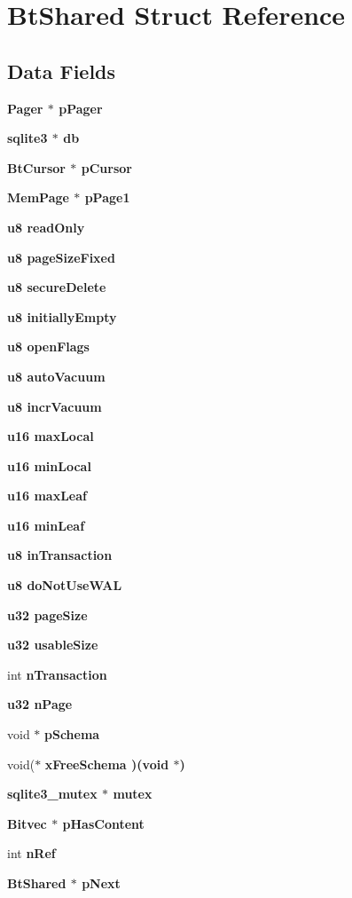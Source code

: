 \section{Bt\-Shared Struct Reference}
\label{structBtShared}
\subsection*{Data Fields}
\begin{CompactItemize}
\item 
\bf{Pager} $\ast$ \bf{p\-Pager}
\item 
\bf{sqlite3} $\ast$ \bf{db}
\item 
\bf{Bt\-Cursor} $\ast$ \bf{p\-Cursor}
\item 
\bf{Mem\-Page} $\ast$ \bf{p\-Page1}
\item 
\bf{u8} \bf{read\-Only}
\item 
\bf{u8} \bf{page\-Size\-Fixed}
\item 
\bf{u8} \bf{secure\-Delete}
\item 
\bf{u8} \bf{initially\-Empty}
\item 
\bf{u8} \bf{open\-Flags}
\item 
\bf{u8} \bf{auto\-Vacuum}
\item 
\bf{u8} \bf{incr\-Vacuum}
\item 
\bf{u16} \bf{max\-Local}
\item 
\bf{u16} \bf{min\-Local}
\item 
\bf{u16} \bf{max\-Leaf}
\item 
\bf{u16} \bf{min\-Leaf}
\item 
\bf{u8} \bf{in\-Transaction}
\item 
\bf{u8} \bf{do\-Not\-Use\-WAL}
\item 
\bf{u32} \bf{page\-Size}
\item 
\bf{u32} \bf{usable\-Size}
\item 
int \bf{n\-Transaction}
\item 
\bf{u32} \bf{n\-Page}
\item 
void $\ast$ \bf{p\-Schema}
\item 
void($\ast$ \bf{x\-Free\-Schema} )(void $\ast$)
\item 
\bf{sqlite3\_\-mutex} $\ast$ \bf{mutex}
\item 
\bf{Bitvec} $\ast$ \bf{p\-Has\-Content}
\item 
int \bf{n\-Ref}
\item 
\bf{Bt\-Shared} $\ast$ \bf{p\-Next}
\item 

\end{CompactItemize}
